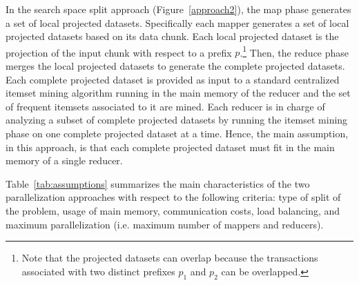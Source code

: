 In the search space split approach (Figure~\ref{approach2}), the map phase generates a set of local projected datasets. Specifically each mapper generates a set of local projected datasets based on its data chunk. Each local projected dataset is the projection of the input chunk with respect to a prefix $p$.\footnote{Note that the projected datasets can overlap because the transactions associated with two distinct prefixes $p_1$ and $p_2$ can be overlapped.} Then, the reduce phase merges the local projected datasets to generate the complete projected datasets. Each complete projected dataset is provided as input to a standard centralized itemset mining algorithm running in the main memory of the reducer and the set of frequent itemsets associated to it are mined.
Each reducer is in charge of analyzing a subset of complete projected datasets by running the itemset mining phase on one complete projected dataset at a time.   
Hence, the main assumption, in this approach, is that each complete projected dataset must fit in the main memory of a single reducer. 

Table~\ref{tab:assumptions} summarizes the main characteristics of the two parallelization approaches with respect to the following criteria: 
type of split of the problem, 
usage of main memory, 
communication costs, 
load balancing, 
and maximum parallelization (i.e. maximum number of mappers and reducers).




